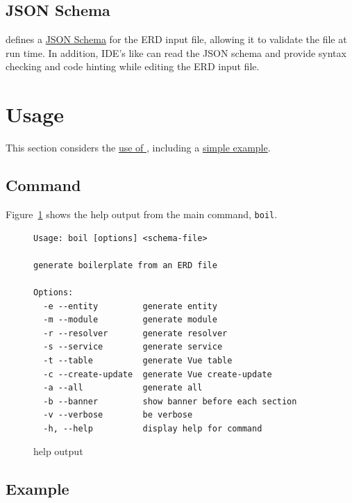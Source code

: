 \documentclass{article}
\begin{document}
\subsection{JSON Schema}
\label{sec:json-schema}

\boil{} defines
a \href{https://json-schema.org/}{JSON Schema}
for the ERD input file,
allowing it to validate the file at run time.
In addition,
IDE's like
\webstorm{}
can read the JSON schema
and provide syntax checking and code hinting
while editing the ERD input file.


\section{Usage}
\label{sec:usage}

This section considers the \hyperref[sec:command]{use of \boil},
including a \hyperref[sec:example]{simple example}.

\subsection{Command}
\label{sec:command}

Figure~\ref{fig:help} shows the help output
from the main \boil{} command, \texttt{boil}.

\begin{figure}[h]
  \centering
\begin{Verbatim}[frame=single,framerule=1pt,rulecolor=blue!50!white]
Usage: boil [options] <schema-file>

generate boilerplate from an ERD file

Options:
  -e --entity         generate entity
  -m --module         generate module
  -r --resolver       generate resolver
  -s --service        generate service
  -t --table          generate Vue table
  -c --create-update  generate Vue create-update
  -a --all            generate all
  -b --banner         show banner before each section
  -v --verbose        be verbose
  -h, --help          display help for command
\end{Verbatim}
  \caption{\boil{} help output}
  \label{fig:help}
\end{figure}

\subsection{Example}
\label{sec:example}
\end{document}

